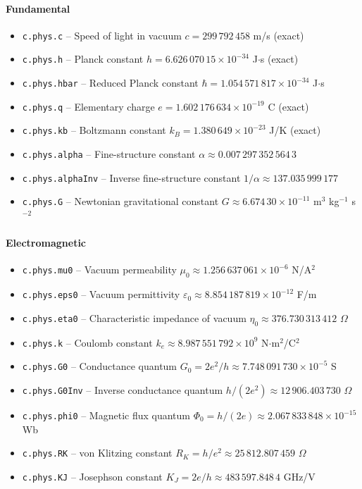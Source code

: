 \paragraph{Fundamental}
\begin{itemize}
\item \texttt{c.phys.c} -- Speed of light in vacuum $c = 299\,792\,458$ m/s (exact)
\item \texttt{c.phys.h} -- Planck constant $h = 6.626\,070\,15 \times 10^{-34}$ J$\cdot$s (exact)
\item \texttt{c.phys.hbar} -- Reduced Planck constant $\hbar = 1.054\,571\,817 \times 10^{-34}$ J$\cdot$s
\item \texttt{c.phys.q} -- Elementary charge $e = 1.602\,176\,634 \times 10^{-19}$ C (exact)
\item \texttt{c.phys.kb} -- Boltzmann constant $k_B = 1.380\,649 \times 10^{-23}$ J/K (exact)
\item \texttt{c.phys.alpha} -- Fine-structure constant $\alpha \approx 0.007\,297\,352\,564\,3$
\item \texttt{c.phys.alphaInv} -- Inverse fine-structure constant $1/\alpha \approx 137.035\,999\,177$
\item \texttt{c.phys.G} -- Newtonian gravitational constant $G \approx 6.674\,30 \times 10^{-11}$ m$^3$ kg$^{-1}$ s$^{-2}$
\end{itemize}

\paragraph{Electromagnetic}
\begin{itemize}
\item \texttt{c.phys.mu0} -- Vacuum permeability $\mu_0 \approx 1.256\,637\,061 \times 10^{-6}$ N/A$^2$
\item \texttt{c.phys.eps0} -- Vacuum permittivity $\varepsilon_0 \approx 8.854\,187\,819 \times 10^{-12}$ F/m
\item \texttt{c.phys.eta0} -- Characteristic impedance of vacuum $\eta_0 \approx 376.730\,313\,412$ $\Omega$
\item \texttt{c.phys.k} -- Coulomb constant $k_e \approx 8.987\,551\,792 \times 10^{9}$ N$\cdot$m$^2$/C$^2$
\item \texttt{c.phys.G0} -- Conductance quantum $G_0 = 2e^2/h \approx 7.748\,091\,730 \times 10^{-5}$ S
\item \texttt{c.phys.G0Inv} -- Inverse conductance quantum $h/(2e^2) \approx 12\,906.403\,730$ $\Omega$
\item \texttt{c.phys.phi0} -- Magnetic flux quantum $\Phi_0 = h/(2e) \approx 2.067\,833\,848 \times 10^{-15}$ Wb
\item \texttt{c.phys.RK} -- von Klitzing constant $R_K = h/e^2 \approx 25\,812.807\,459$ $\Omega$
\item \texttt{c.phys.KJ} -- Josephson constant $K_J = 2e/h \approx 483\,597.848\,4$ GHz/V
\end{itemize}

